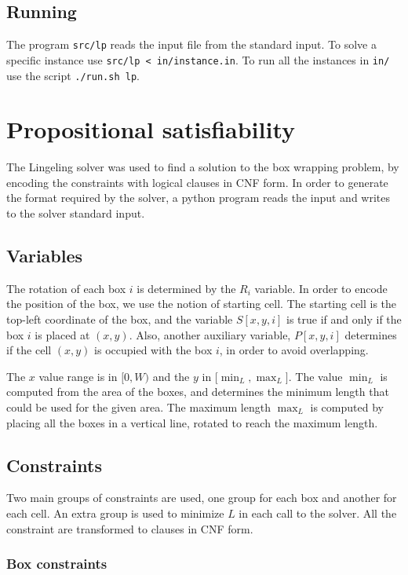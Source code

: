 \documentclass[a4paper]{article}
\begin{document}
\subsection{Running}

The program \texttt{src/lp} reads the input file from the standard input. To 
solve a specific instance use \texttt{src/lp < in/instance.in}. To run all the 
instances in \texttt{in/} use the script \texttt{./run.sh lp}.

\section{Propositional satisfiability}

The Lingeling solver was used to find a solution to the box wrapping problem, by 
encoding the constraints with logical clauses in CNF form. In order to generate 
the format required by the solver, a python program reads the input and writes 
to the solver standard input.

\subsection{Variables}

The rotation of each box $i$ is determined by the $R_i$ variable. In order to 
encode the position of the box, we use the notion of starting cell. The starting 
cell is the top-left coordinate of the box, and the variable $S[x,y,i]$ is true 
if and only if the box $i$ is placed at $(x,y)$. Also, another auxiliary 
variable, $P[x,y,i]$ determines if the cell $(x,y)$ is occupied with the box 
$i$, in order to avoid overlapping.

The $x$ value range is in $[0,W)$ and the $y$ in [$\min_L, \max_L]$. The value 
$\min_L$ is computed from the area of the boxes, and determines the minimum 
length that could be used for the given area. The maximum length $\max_L$ is 
computed by placing all the boxes in a vertical line, rotated to reach the 
maximum length.

\subsection{Constraints}

Two main groups of constraints are used, one group for each box and another for 
each cell. An extra group is used to minimize $L$ in each call to the solver. 
All the constraint are transformed to clauses in CNF form.

\subsubsection{Box constraints}
\end{document}
